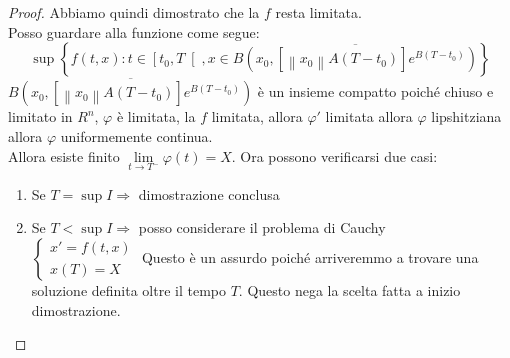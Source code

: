\begin{proof}
	Abbiamo quindi dimostrato che la $f$ resta limitata.\\
	Posso guardare alla funzione come segue:\\
	$$
	\sup
	\left\{f(t,x): t\in\left[t_0,T\right[, x\in \overline{B\left(x_0,
		\left[ 
			\left\|x_0\right\| A \left(T-t_0\right)
		\right]e^{B\left(T-t_0\right)}\right)}
	\right\}
	$$
	$\overline{B\left(x_0,
		\left[ 
		\left\|x_0\right\| A \left(T-t_0\right)
		\right]e^{B\left(T-t_0\right)}\right)}
	$ è un insieme compatto poiché chiuso e limitato in $R^n$, $\varphi$ è limitata, la $f$ limitata, allora $ \varphi'$ limitata allora $\varphi$ lipshitziana allora $\varphi$ uniformemente continua.\\
		Allora esiste finito $\lim\limits_{t\to T^{-}}\varphi(t)=X$. Ora possono verificarsi due casi:\\
	\begin{enumerate}
		\item Se $T=\sup I \Rightarrow$ dimostrazione conclusa
		\item Se $T<\sup I \Rightarrow$ posso considerare il problema di Cauchy \\
		$\left\{ \begin{matrix}  x'=f(t,x)\\x(T)=X \end{matrix} \right.$ Questo è un assurdo poiché arriveremmo a trovare una soluzione definita oltre il tempo $T$. Questo nega la scelta fatta a inizio dimostrazione.
		\end{enumerate}
\end{proof}
